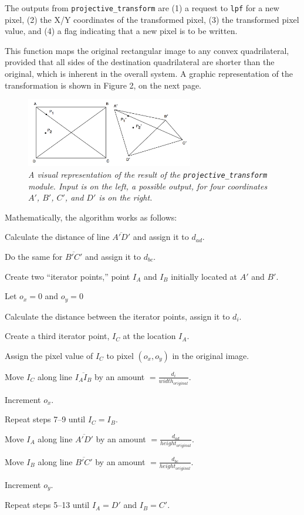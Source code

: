 \documentclass[10pt]{article}
\begin{document}
The outputs from {\tt projective\_transform} are (1) a request to {\tt lpf} for a new pixel, (2) the X/Y coordinates of the transformed pixel, (3) the transformed pixel value, and (4) a flag indicating that a new pixel is to be written.

This function maps the original rectangular image to any convex quadrilateral, provided that all sides of the destination quadrilateral are shorter than the original, which is inherent in the overall system. A graphic representation of the transformation is shown in Figure 2, on the next page.

\begin{figure}[h!]
\centering
\includegraphics[width=0.65\textwidth]{arbiskew_graphic.png}
\caption{\emph{A visual representation of the result of the {\tt projective\_transform} module. Input is on the left, a possible output, for four coordinates $A\prime$, $B\prime$, $C\prime$, and $D\prime$ is on the right.}}
\end{figure}

Mathematically, the algorithm works as follows:
\begin{enumerate*}
\item Calculate the distance of line $\overline{A\prime D\prime}$ and assign it to $d_{ad}$.
\item Do the same for $\overline{B\prime C\prime}$ and assign it to $d_{bc}$.
\item Create two ``iterator points,'' point $I_A$ and $I_B$ initially located at $A\prime$ and $B\prime$.
\item Let $o_x = 0$ and $o_y = 0$
\item Calculate the distance between the iterator points, assign it to $d_i$.
\item Create a third iterator point, $I_C$ at the location $I_A$.
\item Assign the pixel value of $I_C$ to pixel $(o_x, o_y)$ in the original image.
\item Move $I_C$ along line $\overline{I_A I_B}$ by an amount $= \frac{d_i}{width_{original}}$.
\item Increment $o_x$.
\item Repeat steps 7--9 until $I_C = I_B$.
\item Move $I_A$ along line $\overline{A\prime D\prime}$ by an amount $= \frac{d_{ad}}{height_{original}}$.
\item Move $I_B$ along line $\overline{B\prime C\prime}$ by an amount $= \frac{d_{bc}}{height_{original}}$.
\item Increment $o_y$.
\item Repeat steps 5--13 until $I_A = D\prime$ and $I_B = C\prime$.
\end{enumerate*}
\end{document}

